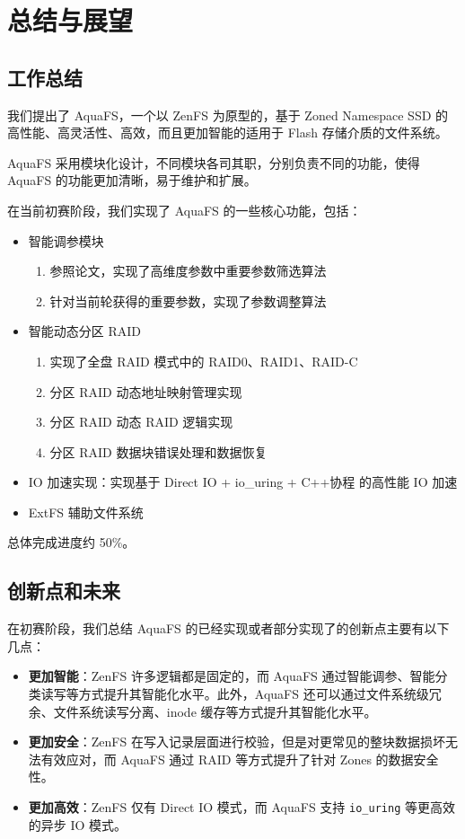 \section{总结与展望}

\subsection{工作总结}

我们提出了 AquaFS，一个以 ZenFS 为原型的，基于 Zoned Namespace SSD 的高性能、高灵活性、高效，而且更加智能的适用于 Flash 存储介质的文件系统。

AquaFS 采用模块化设计，不同模块各司其职，分别负责不同的功能，使得 AquaFS 的功能更加清晰，易于维护和扩展。

在当前初赛阶段，我们实现了 AquaFS 的一些核心功能，包括：

\begin{itemize}
  \item 智能调参模块
  \begin{enumerate}
    \item 参照论文\cite{mahmud_confd_nodate}，实现了高维度参数中重要参数筛选算法
    \item 针对当前轮获得的重要参数，实现了参数调整算法
  \end{enumerate}
  \item 智能动态分区 RAID
  \begin{enumerate}
    \item 实现了全盘 RAID 模式中的 RAID0、RAID1、RAID-C
    \item 分区 RAID 动态地址映射管理实现
    \item 分区 RAID 动态 RAID 逻辑实现
    \item 分区 RAID 数据块错误处理和数据恢复
  \end{enumerate}
  \item IO 加速实现：实现基于 Direct IO + io\_uring + C++协程 的高性能 IO 加速
  \item ExtFS 辅助文件系统
\end{itemize}

总体完成进度约 50\%。



\subsection{创新点和未来}

在初赛阶段，我们总结 AquaFS 的已经实现或者部分实现了的创新点主要有以下几点：

\begin{itemize}
  \item \textbf{更加智能}：ZenFS 许多逻辑都是固定的，而 AquaFS 通过智能调参、智能分类读写等方式提升其智能化水平。此外，AquaFS 还可以通过文件系统级冗余、文件系统读写分离、inode 缓存等方式提升其智能化水平。
  \item \textbf{更加安全}：ZenFS 在写入记录层面进行校验，但是对更常见的整块数据损坏无法有效应对，而 AquaFS 通过 RAID 等方式提升了针对 Zones 的数据安全性。
  \item \textbf{更加高效}：ZenFS 仅有 Direct IO 模式，而 AquaFS 支持 \verb|io_uring| 等更高效的异步 IO 模式。
\end{itemize}

